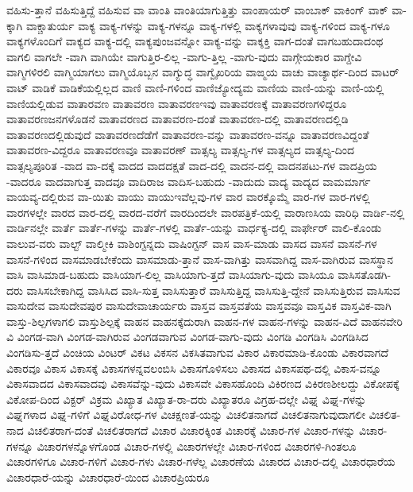 {ವಹಿಸು-ತ್ತಾನೆ
ವಹಿಸುತ್ತಿದ್ದೆ
ವಹಿಸುವ
ವಾ
ವಾಂತಿ
ವಾಂತಿಯಾಗುತ್ತಿತ್ತು
ವಾಂಪಾಯರ್
ವಾಂಬಾಕ್
ವಾಕಿಂಗ್
ವಾಕ್
ವಾ-ಕ್ಕಾಗಿ
ವಾಕ್ಚಾತುರ್ಯ
ವಾಕ್ಯ
ವಾಕ್ಯ-ಗಳನ್ನು
ವಾಕ್ಯ-ಗಳನ್ನೂ
ವಾಕ್ಯ-ಗಳಲ್ಲಿ
ವಾಕ್ಯಗಳಾವುವು
ವಾಕ್ಯ-ಗಳಿಂದ
ವಾಕ್ಯ-ಗಳೂ
ವಾಕ್ಯಗಳೊಂದಿಗೆ
ವಾಕ್ಯದ
ವಾಕ್ಯ-ದಲ್ಲಿ
ವಾಕ್ಯಪುಂಜವನ್ನೋ
ವಾಕ್ಯ-ವನ್ನು
ವಾಕ್ಶಕ್ತಿ
ವಾಗ-ದಂತೆ
ವಾಗಬಹುದಾದಂಥ
ವಾಗಲಿ
ವಾಗಲೇ
-ವಾಗಿ
ವಾಗಿಯೇ
ವಾಗುತ್ತಿರ-ಲಿಲ್ಲ
-ವಾಗು-ತ್ತಿಲ್ಲ
-ವಾಗು-ವುದು
ವಾಗ್ಗೇಯಕಾರ
ವಾಗ್ದೇವಿ
ವಾಗ್ಮಿಗಳಿರಲಿ
ವಾಗ್ಮಿಯಾಗಲು
ವಾಗ್ಮಿಯೊಬ್ಬನ
ವಾಗ್ಯುದ್ಧ
ವಾಗ್ವೈಖರಿಯ
ವಾಙ್ಮಯ
ವಾಚು
ವಾಚ್ಯಾರ್ಥ-ದಿಂದ
ವಾಟರ್
ವಾಟ್
ವಾಡಿಕೆ
ವಾಡಿಕೆಯಲ್ಲಿಲ್ಲದ
ವಾಣಿ
ವಾಣಿ-ಗಳಿಂದ
ವಾಣಿಜ್ಯೋದ್ಯಮ
ವಾಣಿಯ
ವಾಣಿ-ಯನ್ನು
ವಾಣಿ-ಯಲ್ಲಿ
ವಾಣಿಯಲ್ಲಿಡುವ
ವಾತಾರವಣ
ವಾತಾವರಣ
ವಾತಾವರಣಇವು
ವಾತಾವರಣಕ್ಕೆ
ವಾತಾವರಣಗಳಿದ್ದರೂ
ವಾತಾವರಣಜನಗಳೊಡನೆ
ವಾತಾವರಣದ
ವಾತಾವರಣ-ದಂತೆ
ವಾತಾವರಣ-ದಲ್ಲಿ
ವಾತಾವರಣದಲ್ಲಿಡಿ
ವಾತಾವರಣದಲ್ಲಿಡುವುದೆ
ವಾತಾವರಣದೆಡೆಗೆ
ವಾತಾವರಣ-ವನ್ನು
ವಾತಾವರಣ-ವನ್ನೂ
ವಾತಾವರಣವಿದ್ದಂತೆ
ವಾತಾವರಣ-ವಿದ್ದರೂ
ವಾತಾವರಣವೂ
ವಾತಾವರಣ್
ವಾತ್ಸಲ್ಯ
ವಾತ್ಸಲ್ಯ-ಗಳ
ವಾತ್ಸಲ್ಯದ
ವಾತ್ಸಲ್ಯ-ದಿಂದ
ವಾತ್ಸಲ್ಯಪೂರಿತ
-ವಾದ
ವಾ-ದಕ್ಕೆ
ವಾದದ
ವಾದದಕ್ಷತೆ
ವಾದ-ದಲ್ಲಿ
ವಾದನ-ದಲ್ಲಿ
ವಾದನಪಟು-ಗಳ
ವಾದಪ್ರಿಯ
-ವಾದರೂ
ವಾದವಾಗುತ್ತ
ವಾದವೂ
ವಾದಿರಾಜ
ವಾದಿಸ-ಬಹುದು
-ವಾದುದು
ವಾದ್ಯ
ವಾದ್ಯದ
ವಾಮಮಾರ್ಗ
ವಾಯವ್ಯ-ದಲ್ಲಿರುವ
ವಾ-ಯಿತು
ವಾಯು
ವಾಯುಇವೆಲ್ಲವು-ಗಳ
ವಾರ
ವಾರಕ್ಕೊಮ್ಮೆ
ವಾರ-ಗಳ
ವಾರ-ಗಳಲ್ಲಿ
ವಾರಗಳಲ್ಲೇ
ವಾರದ
ವಾರ-ದಲ್ಲಿ
ವಾರದ-ವರೆಗೆ
ವಾರದಿಂದಲೇ
ವಾರಪತ್ರಿಕೆ-ಯಲ್ಲಿ
ವಾರಾಣಸಿಯ
ವಾರಿಧಿ
ವಾರ್ಡಿ-ನಲ್ಲಿ
ವಾರ್ಡಿನಲ್ಲೇ
ವಾರ್ತೆ
ವಾರ್ತೆ-ಗಳನ್ನು
ವಾರ್ತೆ-ಗಳಲ್ಲಿ
ವಾರ್ತೆ-ಯನ್ನು
ವಾರ್ಧಕ್ಯ-ದಲ್ಲಿ
ವಾರ್ಫೇರ್
ವಾಲಿ-ಕೊಂಡು
ವಾಲುವ-ವರು
ವಾಲ್ಟ್
ವಾಲ್ಮೀಕಿ
ವಾಶಿಂಗ್ಟನ್ನದು
ವಾಷಿಂಗ್ಟನ್
ವಾಸ
ವಾಸ-ಮಾಡು
ವಾಸದ
ವಾಸನೆ
ವಾಸನೆ-ಗಳ
ವಾಸನೆ-ಗಳಿಂದ
ವಾಸಮಾಡಬೇಕೆಂದು
ವಾಸಮಾಡು-ತ್ತಾನೆ
ವಾಸ-ವಾಗಿತ್ತು
ವಾಸವಾಗಿದ್ದ
ವಾಸ-ವಾಗಿರುವ
ವಾಸಸ್ಥಾನ
ವಾಸಿ
ವಾಸಿಮಾಡ-ಬಹುದು
ವಾಸಿಯಾಗ-ಲಿಲ್ಲ
ವಾಸಿಯಾಗು-ತ್ತದೆ
ವಾಸಿಯಾಗು-ವುದು
ವಾಸಿಯೂ
ವಾಸಿಸತೊಡಗಿ-ದರು
ವಾಸಿಸಬೇಕಾಗಿದ್ದ
ವಾಸಿಸಿದ
ವಾಸಿ-ಸುತ್ತ
ವಾಸಿಸುತ್ತಾರೆ
ವಾಸಿಸುತ್ತಿದ್ದ
ವಾಸಿಸುತ್ತಿ-ದ್ದೇನೆ
ವಾಸಿಸುತ್ತಿರುವ
ವಾಸಿಸುವ
ವಾಸುದೇವ
ವಾಸುದೇವಪುರ
ವಾಸುದೇವಾಚಾರ್ಯರು
ವಾಸ್ತವ
ವಾಸ್ತವತೆಯ
ವಾಸ್ತವವೂ
ವಾಸ್ತವಿಕ
ವಾಸ್ತವಿಕ-ವಾಗಿ
ವಾಸ್ತು-ಶಿಲ್ಪಗಳಾಗಲಿ
ವಾಸ್ತುಶಿಲ್ಪಕ್ಕೆ
ವಾಹನ
ವಾಹನಕ್ಕೆದುರಾಗಿ
ವಾಹನ-ಗಳ
ವಾಹನ-ಗಳನ್ನು
ವಾಹನ-ವಿದೆ
ವಾಹನವೇರಿ
ವಿ
ವಿಂಗಡ-ವಾಗಿ
ವಿಂಗಡ-ವಾಗಿರುವ
ವಿಂಗಡವಾಗುವ
ವಿಂಗಡ-ವಾಗು-ವುದು
ವಿಂಗಡಿ
ವಿಂಗಡಿಸಿ
ವಿಂಗಡಿಸಿದ
ವಿಂಗಡಿಸು-ತ್ತದೆ
ವಿಂಚಿಯ
ವಿಂಟರ್
ವಿಕಟ
ವಿಕಸನ
ವಿಕಸಿತವಾಗುವ
ವಿಕಾರ
ವಿಕಾರಮಾಡಿ-ಕೊಂಡು
ವಿಕಾರವಾಗದೆ
ವಿಕಾರವೂ
ವಿಕಾಸ
ವಿಕಾಸಕ್ಕೆ
ವಿಕಾಸಗಳನ್ನವಲಂಬಿಸಿ
ವಿಕಾಸಗೊಳಿಸಲು
ವಿಕಾಸದ
ವಿಕಾಸಪಥ-ದಲ್ಲಿ
ವಿಕಾಸ-ವನ್ನೂ
ವಿಕಾಸವಾದದ
ವಿಕಾಸವಾದವು
ವಿಕಾಸವೆನ್ನು-ವುದು
ವಿಕಾಸವೇ
ವಿಕಾಸಹೊಂದಿ
ವಿಕಿರಣದ
ವಿಕಿರಣಶೀಲದ್ದು
ವಿಕೋಪಕ್ಕೆ
ವಿಕೋಪ-ದಿಂದ
ವಿಕ್ಟರ್
ವಿಕ್ರಮ
ವಿಖ್ಯಾತ
ವಿಖ್ಯಾತ-ರಾ-ದರು
ವಿಖ್ಯಾತರೂ
ವಿಗ್ರಹ-ದಲ್ಲೇ
ವಿಘ್ನ
ವಿಘ್ನ-ಗಳನ್ನು
ವಿಘ್ನಗಳಾದ
ವಿಘ್ನ-ಗಳಿಗೆ
ವಿಘ್ನವಿರೋಧ-ಗಳ
ವಿಚಕ್ಷಣತೆ-ಯನ್ನು
ವಿಚಲಿತನಾಗದೆ
ವಿಚಲಿತನಾಗುವುದಾಗಲೀ
ವಿಚಲಿತ-ನಾದ
ವಿಚಲಿತರಾಗ-ದಂತೆ
ವಿಚಲಿತರಾಗದೆ
ವಿಚಾರ
ವಿಚಾರಕ್ಕಿಂತ
ವಿಚಾರಕ್ಕೆ
ವಿಚಾರ-ಗಳ
ವಿಚಾರ-ಗಳನ್ನು
ವಿಚಾರ-ಗಳನ್ನೂ
ವಿಚಾರಗಳನ್ನೊಳಗೊಂಡ
ವಿಚಾರ-ಗಳಲ್ಲಿ
ವಿಚಾರಗಳಲ್ಲೇ
ವಿಚಾರ-ಗಳಿಂದ
ವಿಚಾರಗಳಿ-ಗಿಂತಲೂ
ವಿಚಾರಗಳಿಗೂ
ವಿಚಾರ-ಗಳಿಗೆ
ವಿಚಾರ-ಗಳು
ವಿಚಾರ-ಗಳೆಲ್ಲ
ವಿಚಾರಣೆಯ
ವಿಚಾರದ
ವಿಚಾರ-ದಲ್ಲಿ
ವಿಚಾರಧಾರೆಯ
ವಿಚಾರಧಾರೆ-ಯನ್ನು
ವಿಚಾರಧಾರೆ-ಯಿಂದ
ವಿಚಾರಪ್ರಿಯರೂ
}
